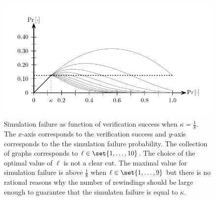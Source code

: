 \documentclass{crypto-exercise}
\begin{document}
\begin{solution}
\begin{figure}[!h]
   \centering
   \includegraphics[scale=0.85]{figures/1102-simulation-failure-iii}
   \caption{Simulation failure as function of verification success when $\kappa=\frac{1}{8}$. The $x$-axis corresponds to the verification success and $y$-axis corresponds to the the simulation failure probability. The collection of graphs corresponds to $\ell\in\set{1,\ldots,10}$. The choice of the optimal value of $\ell$ is not a clear cut. The maximal value for simulation failure is above $\frac{1}{8}$ when $\ell\in\set{1,\ldots,9}$ but there is no rational reasons why the number of rewindings should be large enough to guarantee that the simulaten failure is equal to $\kappa$.}
   \label{fig:knowledge-extraction-trade-offs-ii}
\end{figure}
 

\end{solution}
\end{document}
